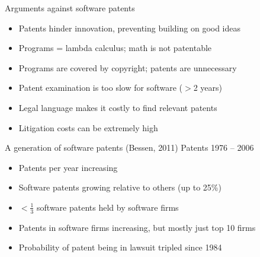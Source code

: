 \documentclass{beamer}
\begin{document}
\begin{frame}{Arguments against software patents}
\begin{itemize}
\item Patents hinder innovation, preventing building on good ideas
\item Programs = lambda calculus; math is not patentable
\item Programs are covered by copyright; patents are unnecessary
\item Patent examination is too slow for software ($>$2 years)
\item Legal language makes it costly to find relevant patents
\item Litigation costs can be extremely high
\end{itemize}
\end{frame}

\begin{frame}{A generation of software patents (Bessen, 2011)}
Patents 1976 -- 2006
\begin{itemize}
\item Patents per year increasing
\item Software patents growing relative to others (up to 25\%)
\item $<$$\frac{1}{3}$ software patents held by software firms
\item Patents in software firms increasing, but mostly just top 10 firms
\item Probability of patent being in lawsuit tripled since 1984
\end{itemize}
\end{frame}
\end{document}
